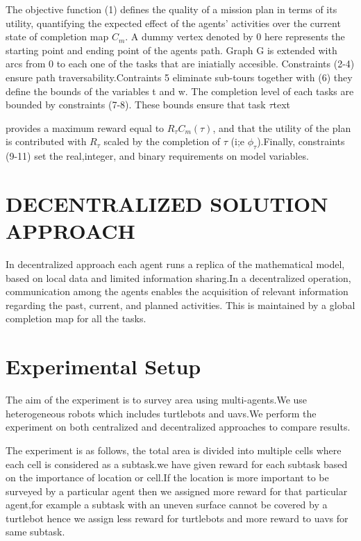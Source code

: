 \documentclass[conference]{IEEEtran}
\begin{document}
The objective function (1) defines the quality of a mission plan in terms of its utility, quantifying the expected effect of the agents' activities over the current state of completion map \(C_{m}\). A dummy vertex denoted by 0 here represents the starting point and ending point of the agents path. Graph G is extended with arcs from 0 to each one of the tasks that are iniatially accesible. Constraints (2-4) ensure path traversability.Contraints 5 eliminate sub-tours together with (6) they define the bounds of the variables t and w. The completion level of each tasks are bounded by constraints (7-8). These bounds ensure that task \(\tau\)text{ provides a maximum reward equal to \({R_{\tau}C_{m}(\tau)}\), and that the utility of the plan is contributed with \(R_{\tau}\) scaled by the completion of \(\tau\) (i;e \(\phi_{\tau}\)).Finally, constraints (9-11) set the real,integer, and binary requirements on model variables\cite{feo2016decentralized}.
\section{DECENTRALIZED SOLUTION APPROACH}
In decentralized approach each agent runs a replica of the mathematical model, based on local data and limited information sharing.In a decentralized operation, communication among the agents enables the acquisition of relevant information regarding the past, current, and planned activities. This is maintained by a global completion map for all the tasks\cite{feo2016decentralized}.

\section{Experimental Setup}
The aim of the experiment is to survey area using multi-agents.We use heterogeneous robots which includes turtlebots and uavs.We perform the experiment on both centralized and decentralized approaches to compare results.

The experiment is as follows, the total area is divided into multiple cells where each cell is considered as a subtask.we have given reward for each subtask based on the importance of location or cell.If the location is more important to be surveyed by a particular agent then we assigned more reward for that particular agent,for example a subtask with an uneven surface cannot be covered by a turtlebot hence we assign less reward for turtlebots and more reward to uavs for same subtask\cite{flushing2014mathematical}.

}
\end{document}
